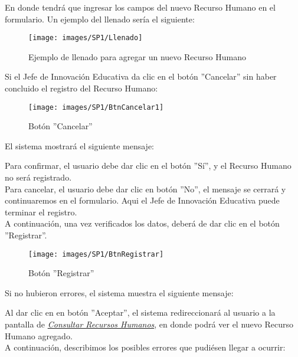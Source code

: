 En donde tendrá que ingresar los campos del nuevo Recurso Humano en el formulario. Un ejemplo del llenado sería el siguiente:
\begin{figure}[!hbtp]
	\centering
	\hypertarget{ejreg}{\texttt{[image: images/SP1/Llenado]}}
	\caption{Ejemplo de llenado para agregar un nuevo Recurso Humano}
	\label{ejreg}
\end{figure}

Si el Jefe de Innovación Educativa da clic en el botón ''Cancelar'' sin haber concluido el registro del Recurso Humano:

\begin{figure}[!hbtp]
	\centering
	\hypertarget{cancel1}{\texttt{[image: images/SP1/BtnCancelar1]}}
	\caption{Botón ''Cancelar''}
	\label{cancel1}
\end{figure}

El sistema mostrará el siguiente mensaje:


Para confirmar, el usuario debe dar clic en el botón ''Sí'', y el Recurso Humano no será registrado.\\

Para cancelar, el usuario debe dar clic en botón ''No'', el mensaje se cerrará y continuaremos en el formulario. Aqui el Jefe de Innovación Educativa puede terminar el registro.\\

A continuación, una vez verificados los datos, deberá de dar clic en el botón ''Registrar''.
\begin{figure}[!hbtp]
	\centering
	\hypertarget{btnreg}{\texttt{[image: images/SP1/BtnRegistrar]}}
	\caption{Botón ''Registrar''}
	\label{btnreg}
\end{figure}

Si no hubieron errores, el sistema muestra el siguiente mensaje:

Al dar clic en en botón ''Aceptar'', el sistema redireccionará al usuario a la pantalla de \hyperlink{consultarrh}{\textit{Consultar Recursos Humanos}}, en donde podrá ver el nuevo Recurso Humano agregado.\\

A continuación, describimos los posibles errores que pudiésen llegar a ocurrir:

